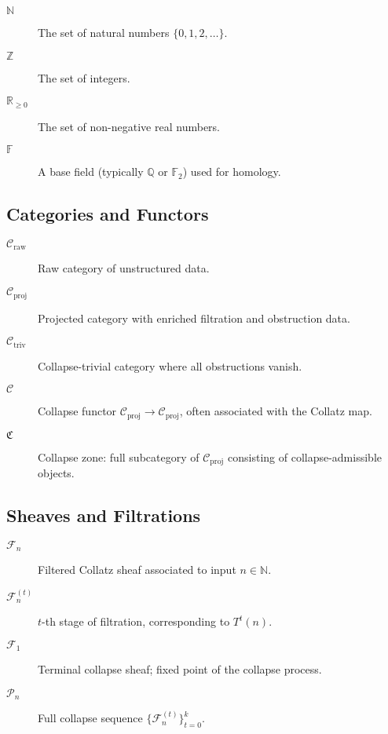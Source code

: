 \documentclass[11pt]{article}
\begin{document}
\begin{description}
  \item[\( \mathbb{N} \)] The set of natural numbers \( \{0, 1, 2, \dots\} \).
  \item[\( \mathbb{Z} \)] The set of integers.
  \item[\( \mathbb{R}_{\geq 0} \)] The set of non-negative real numbers.
  \item[\( \mathbb{F} \)] A base field (typically \( \mathbb{Q} \) or \( \mathbb{F}_2 \)) used for homology.
\end{description}

\subsection*{Categories and Functors}

\begin{description}
  \item[\( \mathcal{C}_{\mathrm{raw}} \)] Raw category of unstructured data.
  \item[\( \mathcal{C}_{\mathrm{proj}} \)] Projected category with enriched filtration and obstruction data.
  \item[\( \mathcal{C}_{\mathrm{triv}} \)] Collapse-trivial category where all obstructions vanish.
  \item[\( \mathcal{C} \)] Collapse functor \( \mathcal{C}_{\mathrm{proj}} \to \mathcal{C}_{\mathrm{proj}} \), often associated with the Collatz map.
  \item[\( \mathfrak{C} \)] Collapse zone: full subcategory of \( \mathcal{C}_{\mathrm{proj}} \) consisting of collapse-admissible objects.
\end{description}

\subsection*{Sheaves and Filtrations}

\begin{description}
  \item[\( \mathcal{F}_n \)] Filtered Collatz sheaf associated to input \( n \in \mathbb{N} \).
  \item[\( \mathcal{F}_n^{(t)} \)] \( t \)-th stage of filtration, corresponding to \( T^t(n) \).
  \item[\( \mathcal{F}_1 \)] Terminal collapse sheaf; fixed point of the collapse process.
  \item[\( \mathcal{P}_n \)] Full collapse sequence \( \{ \mathcal{F}_n^{(t)} \}_{t=0}^k \).
\end{description}
\end{document}

